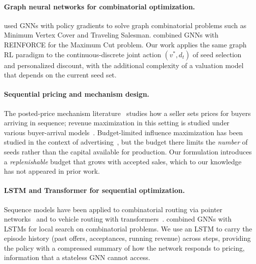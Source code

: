 \paragraph{Graph neural networks for combinatorial optimization.}
\citet{khalil2017learning} used GNNs with policy gradients to solve graph
combinatorial problems such as Minimum Vertex Cover and Traveling Salesman.
\citet{ding2020erdos} combined GNNs with REINFORCE for the Maximum Cut problem.
Our work applies the same graph RL paradigm to the continuous-discrete joint action
$(v^*, d_t)$ of seed selection and personalized discount, with the additional
complexity of a valuation model that depends on the current seed set.

\paragraph{Sequential pricing and mechanism design.}
The posted-price mechanism literature~\citep{blumrosen2011posted,roughgarden2012supply}
studies how a seller sets prices for buyers arriving in sequence; revenue maximization
in this setting is studied under various buyer-arrival
models~\citep{chawla2010multi}.
Budget-limited influence maximization has been studied in the context of
advertising~\citep{nguyen2013budget,zhang2016maximizing}, but the budget there
limits the \emph{number} of seeds rather than the capital available for production.
Our formulation introduces a \emph{replenishable} budget that grows with accepted
sales, which to our knowledge has not appeared in prior work.

\paragraph{LSTM and Transformer for sequential optimization.}
Sequence models have been applied to combinatorial routing via pointer
networks~\citep{vinyals2015pointer} and to vehicle routing with
transformers~\citep{kool2019attention}.
\citet{chen2019learning} combined GNNs with LSTMs for local search on combinatorial
problems.
We use an LSTM to carry the episode history (past offers, acceptances, running revenue)
across steps, providing the policy with a compressed summary of how the network
responds to pricing, information that a stateless GNN cannot access.
